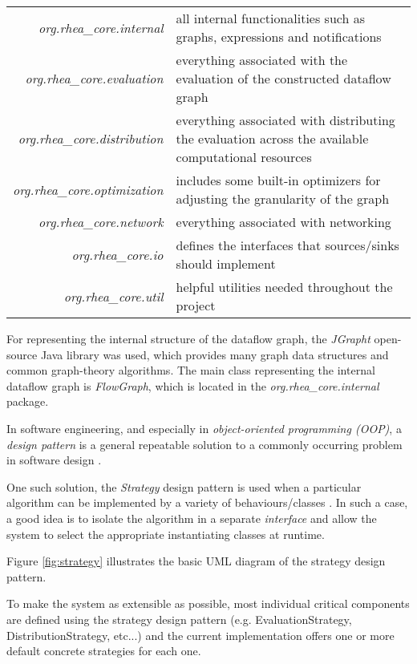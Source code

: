 \documentclass{dithesis}
\begin{document}
\begin{tabularx}{\textwidth}{rX}
	\textit{org.rhea\_core.internal} 
	& all internal functionalities such as graphs, expressions and notifications \\
	\textit{org.rhea\_core.evaluation}
	& everything associated with the evaluation of the constructed dataflow graph \\
	\textit{org.rhea\_core.distribution}
	& everything associated with distributing the evaluation across the available computational resources \\
	\textit{org.rhea\_core.optimization}	
	& includes some built-in optimizers for adjusting the  granularity of the graph \\
	\textit{org.rhea\_core.network}	
	& everything associated with networking \\
	\textit{org.rhea\_core.io}
	& defines the interfaces that sources/sinks should implement \\
	\textit{org.rhea\_core.util}
	& helpful utilities needed throughout the project \\
\end{tabularx}


For representing the internal structure of the dataflow graph, the \textit{JGrapht} open-source Java library was used, which provides many graph data structures and common graph-theory algorithms\cite{jgraph}. The main class representing the internal dataflow graph is \textit{FlowGraph},  which is located in the \textit{org.rhea\_core.internal} package.


In software engineering, and especially in \textit{object-oriented programming (OOP)}, a \textit{design pattern} is a general repeatable solution to a commonly occurring problem in software design \cite{design}.

One such solution, the \textit{Strategy} design pattern is used when a particular algorithm can be implemented by a variety of behaviours/classes \cite{design}. In such a case, a good idea is to isolate the algorithm in a separate \textit{interface} and allow the system to select the appropriate instantiating classes at runtime.

Figure \ref{fig:strategy} illustrates the basic UML diagram of the strategy design pattern.

To make the system as extensible as possible, most individual critical components are defined using the strategy design pattern (e.g. EvaluationStrategy, DistributionStrategy, etc...) and the current implementation offers one or more default concrete strategies for each one.
\end{document}
